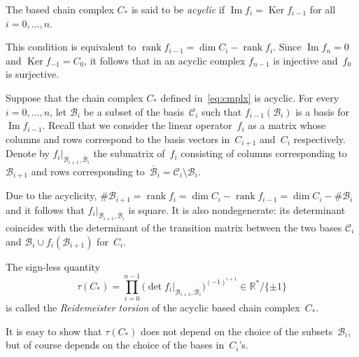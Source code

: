 \documentclass[pdftex]{sigma}
\DeclareMathOperator{\rank}{rank}
\DeclareMathOperator{\Ima}{Im}
\DeclareMathOperator{\Ker}{Ker}
\begin{document}
\begin{definition}
\label{dfn:acycl}
The based chain complex $C_*$ is said to be \emph{acyclic} if $\Ima f_i = \Ker f_{i-1}$ for all~$i = 0, \ldots, n$.
\end{definition}

\begin{remark}
This condition is equivalent to $\rank f_{i-1} = \dim C_i - \rank f_i$. Since $\Ima f_n = 0$ and $\Ker f_{-1} = C_0$, it follows that in an acyclic complex $f_{n-1}$ is injective and~$f_0$ is surjective.
\end{remark}

Suppose that the chain complex $C_*$ def\/ined in~\eqref{eq:cmplx} is acyclic. For every $i = 0, \ldots, n$, let $\mathcal B_i$ be a subset of the basis~$\mathcal C_i$ such that $f_{i-1} (\mathcal B_i)$ is a basis for~$\Ima f_{i-1}$. Recall that we consider the linear operator~$f_i$ as a matrix whose columns and rows correspond to the basis vectors in~$C_{i+1}$ and~$C_i$ respectively. Denote by $f_i|_{\mathcal B_{i+1}, \overline{\mathcal B}_i}$ the submatrix of~$f_i$ consisting of columns corresponding to $\mathcal B_{i+1}$ and rows corresponding to~$\overline{\mathcal B}_i = \mathcal C_i \setminus \mathcal B_i$.

Due to the acyclicity, $\#\mathcal B_{i+1} = \rank f_i = \dim C_i - \rank f_{i-1} = \dim C_i - \#\mathcal B_i$ and it follows that $f_i|_{\mathcal B_{i+1}, \overline{\mathcal B}_i}$ is square. It is also nondegenerate: its determinant coincides with the determinant of the transition matrix between the two bases $\mathcal C_i$ and $\mathcal B_i \cup f_i(\mathcal B_{i+1})$ for~$C_i$.

\begin{definition}
\label{dfn:tors}
The sign-less quantity
\begin{equation}
\label{eq:torsion}
\tau(C_*) = \prod\limits_{i = 0}^{n-1} \bigl(\det f_i|_{\mathcal B_{i+1}, \overline{\mathcal B}_i}\bigr)^{(- 1)^{i+1}} \in \mathbb{R}^* / \{\pm 1\}
\end{equation}
is called the \emph{Reidemeister torsion} of the acyclic based chain complex~$C_*$.
\end{definition}

\begin{remark}
It is easy to show that $\tau(C_*)$ does not depend on the choice of the subsets~$\mathcal B_i$, but of course depends on the choice of the bases in~$C_i$'s.
\end{remark}
\end{document}

